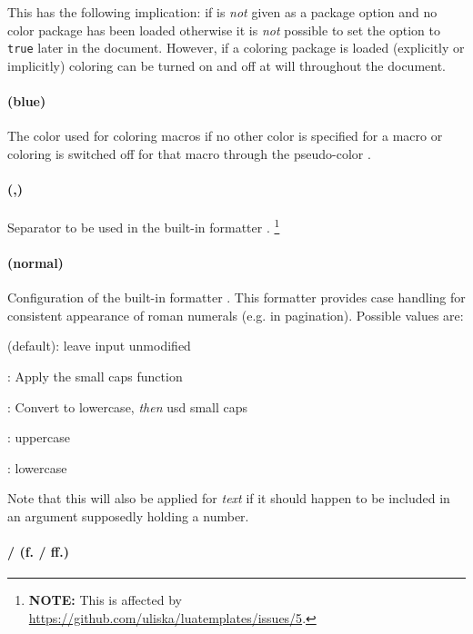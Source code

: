 \documentclass{scrartcl}
\begin{document}
This has the following implication: if  is \emph{not} given as a
package option and no color package has been loaded otherwise it is \emph{not}
possible to set the option to \texttt{true} later in the document.  However, if
a coloring package is loaded (explicitly or implicitly) coloring can be turned
on and off at will throughout the document.

\paragraph{ (blue)}

The color used for coloring macros if no other color is specified for a macro or
coloring is switched off for that macro through the pseudo-color
.


\paragraph{ (,)}

Separator to be used in the built-in formatter .%
\footnote{\textbf{NOTE:} This is affected by
\url{https://github.com/uliska/luatemplates/issues/5}.}


\paragraph{ (normal)}

Configuration of the built-in formatter .  This formatter
provides case handling for consistent appearance of roman numerals (e.g. in
pagination).  Possible values are:

\begin{itemize*}
\item {} (default): leave input unmodified
\item {}: Apply the small caps function
\item {}: Convert to lowercase, \emph{then} usd small caps
\item {}: uppercase
\item {}: lowercase
\end{itemize*}

\noindent Note that this will also be applied for \emph{text} if it should
happen to be included in an argument supposedly holding a number.

\paragraph{ /  (f. / ff.)}
\end{document}
